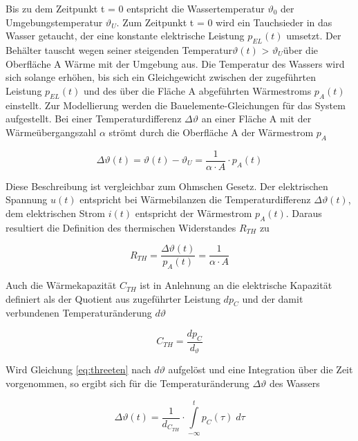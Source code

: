 \noindent Bis zu dem Zeitpunkt t = 0 entspricht die Wassertemperatur $\vartheta _{0}$ der Umgebungstemperatur $\vartheta _{U}$. Zum Zeitpunkt t = 0 wird ein Tauchsieder in das Wasser getaucht, der eine konstante elektrische Leistung $p _{EL}(t)$ umsetzt. Der Behälter tauscht wegen seiner steigenden Temperatur$\vartheta (t)$ > $\vartheta _{U}$über die Oberfläche A Wärme mit der Umgebung aus. Die Temperatur des Wassers wird sich solange erhöhen, bis sich ein Gleichgewicht zwischen der zugeführten Leistung $p _{EL}(t)$ und des über die Fläche A abgeführten Wärmestroms $p _{A}(t)$ einstellt.
Zur Modellierung werden die Bauelemente-Gleichungen für das System aufgestellt. Bei einer Temperaturdifferenz
$\Delta \vartheta $ an einer Fläche A mit der Wärmeübergangszahl $\alpha $ strömt durch die Oberfläche A der Wärmestrom $p_{A}$

\begin{equation}\label{eq:eight}
\Delta \vartheta(t) = \vartheta (t) - \vartheta _{U} = \frac{1}{\alpha \cdot A} \cdot p_{A}(t)
\end{equation}

\noindent Diese Beschreibung ist vergleichbar zum Ohmschen Gesetz. Der elektrischen Spannung $u(t)$ entspricht bei Wärmebilanzen die Temperaturdifferenz $\Delta \vartheta (t) $, dem elektrischen Strom $i(t)$ entspricht der Wärmestrom $p _{A}(t)$. Daraus resultiert die Definition des thermischen Widerstandes $R_{TH}$ zu

\begin{equation}\label{eq:threenine}
R_{TH} = \frac{\Delta \vartheta (t)}{p _{A}(t)}=\frac{1}{\alpha \cdot A}
\end{equation}

\noindent Auch die Wärmekapazität $C_{TH}$ ist in Anlehnung an die elektrische Kapazität definiert als der Quotient aus zugeführter Leistung $dp_{C}$ und der damit verbundenen Temperaturänderung $d \vartheta$

\begin{equation}\label{eq:threeten}
C_{TH}= \frac{dp_{C}}{d_{\vartheta}}
\end{equation}

\noindent Wird Gleichung \eqref{eq:threeten} nach $d \vartheta$ aufgelöst und eine Integration über die Zeit vorgenommen, so ergibt sich für die Temperaturänderung $ \Delta \vartheta$ des Wassers

\begin{equation}\label{eq:threeelf}
\Delta \vartheta (t) = \frac{1}{d_{C_{TH}}} \cdot \int\limits _{-\infty }^{t} p_{C} (\tau) \; d\tau
\end{equation}


